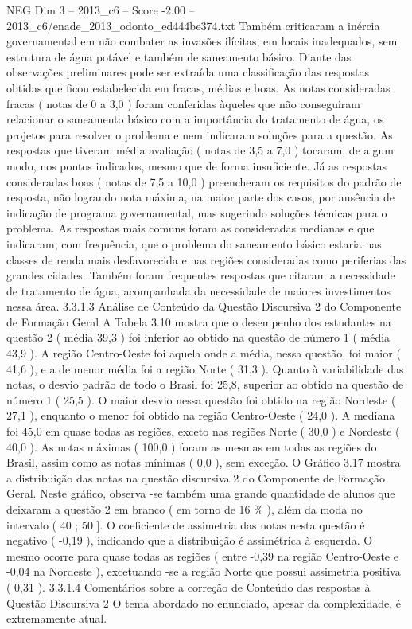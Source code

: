 \begin{textsample}{NEG Dim 3 – 2013\_c6 – Score -2.00 – 2013\_c6/enade\_2013\_odonto\_ed444be374.txt}
Também criticaram a inércia governamental em não combater as invasões ilícitas, em locais inadequados, sem estrutura de água potável e também de saneamento básico.
Diante das observações preliminares pode ser extraída uma classificação das respostas obtidas que ficou estabelecida em fracas, médias e boas.
As notas consideradas fracas ( notas de 0 a 3,0 ) foram conferidas àqueles que não conseguiram relacionar o saneamento básico com a importância do tratamento de água, os projetos para resolver o problema e nem indicaram soluções para a questão.
As respostas que tiveram média avaliação ( notas de 3,5 a 7,0 ) tocaram, de algum modo, nos pontos indicados, mesmo que de forma insuficiente.
Já as respostas consideradas boas ( notas de 7,5 a 10,0 ) preencheram os requisitos do padrão de resposta, não logrando nota máxima, na maior parte dos casos, por ausência de indicação de programa governamental, mas sugerindo soluções técnicas para o problema.
As respostas mais comuns foram as consideradas medianas e que indicaram, com frequência, que o problema do saneamento básico estaria nas classes de renda mais desfavorecida e nas regiões consideradas como periferias das grandes cidades.
Também foram frequentes respostas que citaram a necessidade de tratamento de água, acompanhada da necessidade de maiores investimentos nessa área. 3.3.1.3 Análise de Conteúdo da Questão Discursiva 2 do Componente de Formação Geral A Tabela 3.10 mostra que o desempenho dos estudantes na questão 2 ( média 39,3 ) foi inferior ao obtido na questão de número 1 ( média 43,9 ).
A região Centro-Oeste foi aquela onde a média, nessa questão, foi maior ( 41,6 ), e a de menor média foi a região Norte ( 31,3 ).
Quanto à variabilidade das notas, o desvio padrão de todo o Brasil foi 25,8, superior ao obtido na questão de número 1 ( 25,5 ).
O maior desvio nessa questão foi obtido na região Nordeste ( 27,1 ), enquanto o menor foi obtido na região Centro-Oeste ( 24,0 ).
A mediana foi 45,0 em quase todas as regiões, exceto nas regiões Norte ( 30,0 ) e Nordeste ( 40,0 ).
As notas máximas ( 100,0 ) foram as mesmas em todas as regiões do Brasil, assim como as notas mínimas ( 0,0 ), sem exceção.
O Gráfico 3.17 mostra a distribuição das notas na questão discursiva 2 do Componente de Formação Geral.
Neste gráfico, observa -se também uma grande quantidade de alunos que deixaram a questão 2 em branco ( em torno de 16 \% ), além da moda no intervalo ( 40 ; 50 ].
O coeficiente de assimetria das notas nesta questão é negativo ( -0,19 ), indicando que a distribuição é assimétrica à esquerda.
O mesmo ocorre para quase todas as regiões ( entre -0,39 na região Centro-Oeste e -0,04 na Nordeste ), excetuando -se a região Norte que possui assimetria positiva ( 0,31 ). 3.3.1.4 Comentários sobre a correção de Conteúdo das respostas à Questão Discursiva 2 O tema abordado no enunciado, apesar da complexidade, é extremamente atual.

\end{textsample}
